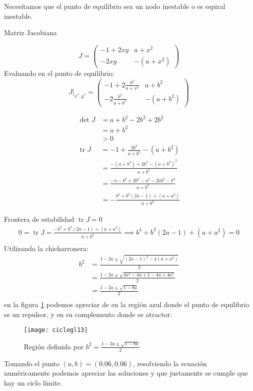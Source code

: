 Necesitamos que el punto de equilibrio sea un nodo inestable o es espiral inestable.

Matriz Jacobiana

\begin{equation*}
  J = \begin{pmatrix} -1+2xy & a + x^2 \\ -2xy &-(a+x^2) \end{pmatrix}
\end{equation*}
Evaluando en el punto de equilibrio:
\begin{equation*}
   \left. J \right|_{x^*,y^*} = \begin{pmatrix} -1+2 \frac{b^2}{a+x^2} & a+b^2 \\ -2 \frac{b^2}{a+b^2} & -(a+b^2) \end{pmatrix}  
\end{equation*}

\begin{align*}
  \operatorname{det} J  &= a+b^2-2b^2+2b^2 \\
   &= a+b^2\\
   &>0  \\
   \operatorname{tr}J  &= -1 + \frac{2b^2}{a+b^2} - (a+b^2) \\
    &= \frac{-(a+b^2)+2b^2-(a+b^2)^2}{a+b^2} \\
    &= \frac{-a-b^2+2b^2-a^2-2ab^2-b^{4} }{a+b^2} \\
    &= - \frac{b^{4}+b^2(2a-1)+(a+a^2)}{a+b^2}
\end{align*}

Frontera de estabilidad $  \operatorname{tr}J =0$
\begin{gather*}
  0 = \operatorname{tr}J = \frac{-b^{4}+b^2(2a-1)+(a+a^2)}{a+b^2} \implies b^{4}+b^2(2a-1)+(a+a^2)=0 \\
\end{gather*}
Utilizando la chicharronera:
\begin{align*}
   b^2  &= \frac{1-2a\pm \sqrt{(2a-1)^2-4(a+a^2)}}{2}  \\ 
    &= \frac{1-2a\pm \sqrt{4a^2-4a+1-4a+4a^2}}{2} \\ 
     &= \frac{1-2a\pm \sqrt{1-8a}}{2} \\
\end{align*}
en la figura \ref{regglic5} podemos apreciar de en la región azul donde el punto de equilibrio es un repulsor, y en su complemento donde es atractor.
\begin{figure}[H]
  \centering
  \texttt{[image: ciclogl13]}
  \caption{Región definida por $b^2=\frac{1-2a\pm \sqrt{1-8a}}{2}$}
  \label{regglic5} 
\end{figure}
Tomando el punto $(a,b)=(0.06,0.06)$, resolviendo la ecuación numéricamente podemos apreciar las soluciones y que justamente se cumple que hay un ciclo límite.
\begin{figure}[H]
 \centering
   \vfill
\end{figure}

            




